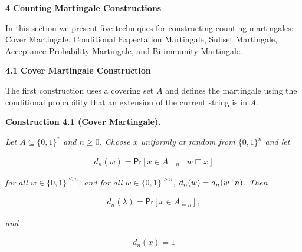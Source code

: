 \documentclass[10pt,a4paper]{article}
\begin{document}






\par\medskip\noindent\textbf{
4 Counting Martingale Constructions}\par




In this section we present five techniques for constructing counting martingales: Cover Martingale, Conditional Expectation Martingale, Subset Martingale, Acceptance Probability Martingale, and Bi-immunity Martingale.\par




\par\medskip\noindent\textbf{
4.1 Cover Martingale Construction}\par




The first construction uses a covering set $A$ and defines the martingale using the conditional probability that an extension of the current string is in $A$.\par





\par\medskip\noindent\textbf{
\textbf{Construction 4.1}\textbf{ }(Cover Martingale)\textbf{.}
}\par



\emph{Let
$A\subseteq\{0,1\}^{*}$ and $n\geq 0$.
Choose $x$ uniformly at random from $\{0,1\}^{n}$ and let}\par


\[\begin{gathered}
d_{n}(w)=\mathsf{Pr}[x\in A_{=n}\mid w\sqsubseteq x]
\end{gathered}\]


\emph{for all $w\in\{0,1\}^{\leq n}$, and for all $w\in\{0,1\}^{>n}$, $d_{n}(w)=d_{n}(w\negthinspace\upharpoonright\negthinspace n)$.
Then}\par


\[\begin{gathered}
d_{n}(\lambda)=\mathsf{Pr}[x\in A_{=n}],
\end{gathered}\]


\emph{and}\par


\[\begin{gathered}
d_{n}(x)=1
\end{gathered}\]
\end{document}

